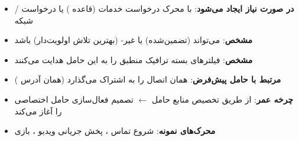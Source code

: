 
\begin{itemize}
\tightlist
\item
  \textbf{در صورت نیاز ایجاد می‌شود}: با محرک درخواست خدمات (قاعده ) یا درخواست /\allowbreak{}شبکه
\item
  \textbf{ مشخص}: می‌تواند  (تضمین‌شده) یا غیر- (بهترین تلاش اولویت‌دار) باشد
\item
  \textbf{ مشخص}: فیلترهای بسته ترافیک منطبق را به این حامل هدایت می‌کنند
\item
  \textbf{مرتبط با حامل پیش‌فرض}: همان اتصال  را به اشتراک می‌گذارد (همان آدرس )
\item
  \textbf{چرخه عمر}: از طریق تخصیص منابع حامل \ensuremath{\leftarrow} تصمیم  فعال‌سازی حامل اختصاصی را آغاز می‌کند
\item
  \textbf{محرک‌های نمونه}: شروع تماس ، پخش جریانی ویدیو ، بازی 
\end{itemize}



